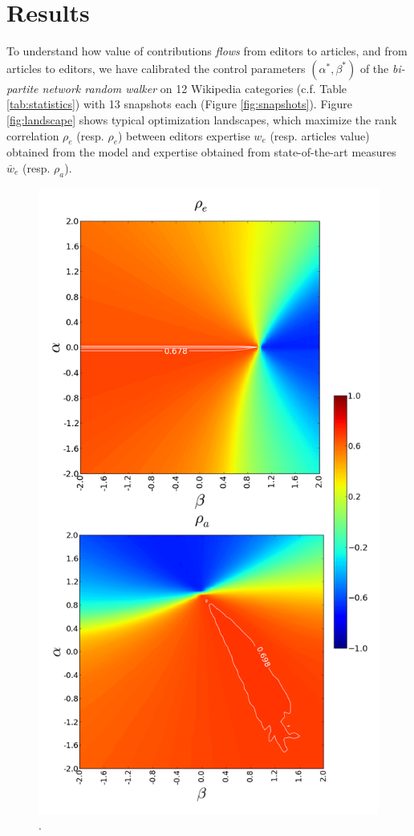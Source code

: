 \section{Results}
To understand how value of contributions {\it flows} from editors to articles, and from articles to editors, we have calibrated the control parameters $(\alpha^*,\beta^*)$ of the {\it bi-partite network random walker} on 12 Wikipedia categories (c.f. Table \ref{tab:statistics}) with 13 snapshots each (Figure \ref{fig:snapshots}). Figure \ref{fig:landscape} shows typical optimization landscapes, which maximize the rank correlation $\rho_e$ (resp. $\rho_e$) between editors expertise $w_{e}$ (resp. articles value) obtained from the model and expertise obtained from state-of-the-art measures $\bar{w}_e$ (resp. $\rho_a$). 

\begin{figure}[!t]
\centering
\includegraphics[width=0.9\columnwidth]{../Figures/contour_fem_combined.png}.

\end{figure}
